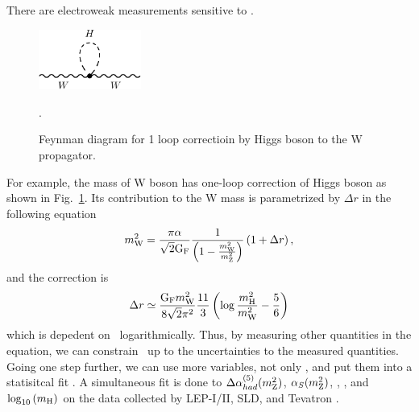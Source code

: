 There are electroweak measurements sensitive to \mHi. 
\begin{figure}[t]
\centering
\includegraphics[width=0.3\textwidth]{figures/FD_Wmass_Hloop.pdf}
\caption{Feynman diagram for 1 loop correctioin by Higgs boson to the W propagator.}.
\label{fig:FD_Wmass_Hloop}
\end{figure}
For example, the mass of W boson has one-loop correction of Higgs boson 
as shown in Fig.~\ref{fig:FD_Wmass_Hloop}. Its contribution to the W mass 
is parametrized by $\Delta r$ in the following equation~\cite{Djouadi20081} %
\begin{eqnarray} 
m_{\mathrm{W}}^2 
= 
\frac{\pi\alpha}{\sqrt{2} \mathrm{G_{\mathrm{F}}}} 
\frac{1}{\left( 1 - \frac{m_{\mathrm{W}}^2}{m_{\mathrm{Z}}^2} \right)} 
\left( 1 + \Delta r \right),
\end{eqnarray} 
and the correction is 
\begin{eqnarray}
\Delta r \simeq 
\frac{\mathrm{G_{\mathrm{F}}} m_{\mathrm{W}}^2}{8 \sqrt{2} \pi^2} \frac{11}{3} 
\left( \log \frac{m_{\mathrm{H}}^2}{m_{\mathrm{W}}^2} - \frac{5}{6} \right)
\end{eqnarray} 
which is depedent on \mHi\ logarithmically. Thus, by measuring other quantities 
in the equation, we can constrain \mHi\ up to the uncertainties to the measured 
quantities. Going one step further, we can use more variables, not only \mW, 
and put them into a statisitcal fit \cite{LEP-2}. A simultaneous fit is done to
$\Delta \alpha_{had}^{(5)}(m_{\mathrm{Z}}^2)$, $\alpha_S(m_{\mathrm{Z}}^2)$,  
\mZ, \mt, and  $\log_{10} \left( m_{\mathrm{H}} \right)$
on the data collected by LEP-I/II, SLD, and Tevatron \cite{LEP-2}.  
